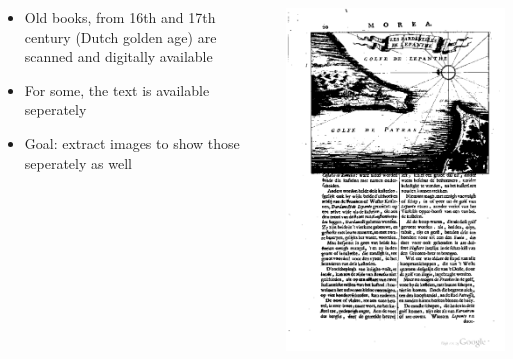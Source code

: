 

{
	\begin{columns}
		\begin{column}{.5\textwidth}
			\begin{itemize}
				\item Old books, from 16th and 17th century (Dutch golden age)  are
			scanned and digitally available
				\item For some, the text is available seperately
				\item Goal: extract images to show those seperately as well
			\end{itemize}
		\end{column}
		\begin{column}{.5\textwidth}
			\includegraphics[width=.9\columnwidth]{resources/bookExample}
		\end{column}
	\end{columns}
}

